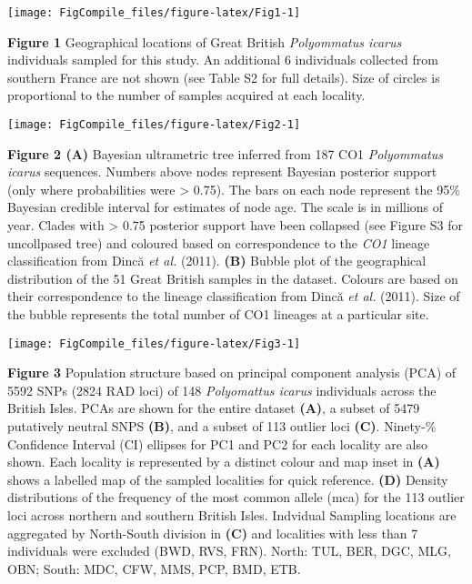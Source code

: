 \documentclass[12pt,]{article}
\title{}
\author{}
\date{}
\begin{document}
 \pagestyle{plain}

\begin{center}\texttt{[image: FigCompile\_files/figure-latex/Fig1-1]} \end{center}

\textbf{Figure 1} Geographical locations of Great British
\emph{Polyommatus icarus} individuals sampled for this study. An
additional 6 individuals collected from southern France are not shown
(see Table S2 for full details). Size of circles is proportional to the
number of samples acquired at each locality.

\texttt{[image: FigCompile\_files/figure-latex/Fig2-1]}

\textbf{Figure 2 (A)} Bayesian ultrametric tree inferred from 187 CO1
\emph{Polyommatus icarus} sequences. Numbers above nodes represent
Bayesian posterior support (only where probabilities were \textgreater{}
0.75). The bars on each node represent the 95\% Bayesian credible
interval for estimates of node age. The scale is in millions of year.
Clades with \textgreater{} 0.75 posterior support have been collapsed
(see Figure S3 for uncollpased tree) and coloured based on
correspondence to the \emph{CO1} lineage classification from Dincă
\emph{et al.} (2011). \textbf{(B)} Bubble plot of the geographical
distribution of the 51 Great British samples in the dataset. Colours are
based on their correspondence to the lineage classification from Dincă
\emph{et al.} (2011). Size of the bubble represents the total number of
CO1 lineages at a particular site.

\pagebreak

\texttt{[image: FigCompile\_files/figure-latex/Fig3-1]}

\textbf{Figure 3} Population structure based on principal component
analysis (PCA) of 5592 SNPs (2824 RAD loci) of 148 \emph{Polyomattus
icarus} individuals across the British Isles. PCAs are shown for the
entire dataset \textbf{(A)}, a subset of 5479 putatively neutral SNPS
\textbf{(B)}, and a subset of 113 outlier loci \textbf{(C)}. Ninety-\%
Confidence Interval (CI) ellipses for PC1 and PC2 for each locality are
also shown. Each locality is represented by a distinct colour and map
inset in \textbf{(A)} shows a labelled map of the sampled localities for
quick reference. \textbf{(D)} Density distributions of the frequency of
the most common allele (mca) for the 113 outlier loci across northern
and southern British Isles. Indvidual Sampling locations are aggregated
by North-South division in \textbf{(C)} and localities with less than 7
individuals were excluded (BWD, RVS, FRN). North: TUL, BER, DGC, MLG,
OBN; South: MDC, CFW, MMS, PCP, BMD, ETB.
\end{document}
